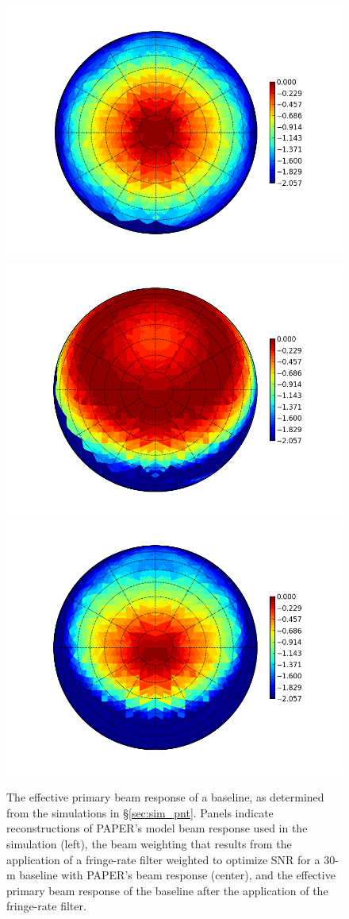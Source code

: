 \documentclass[twocolumn,numberedappendix]{emulateapj}
\begin{document}
\begin{figure}\centering
\includegraphics[width=.6\columnwidth]{plots/beam_raw.png}
\includegraphics[width=.6\columnwidth]{plots/beam_wgt.png}
\includegraphics[width=.6\columnwidth]{plots/beam_fng.png}
\caption{
The effective primary beam response of a baseline, as determined from the simulations in \S\ref{sec:sim_pnt}.
Panels indicate reconstructions of PAPER's model beam response used in the simulation (left), the 
beam weighting that results from the application of a fringe-rate filter weighted to optimize SNR for
a 30-m baseline with PAPER's beam response (center), and the effective primary beam response of the
baseline after the application of the fringe-rate filter.
}\label{fig:}
\end{figure}
\end{document}
